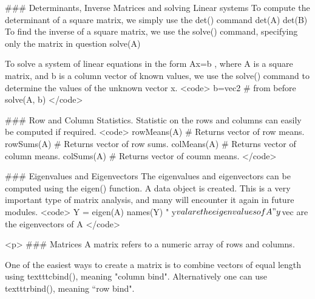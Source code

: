 ### Determinants, Inverse Matrices and solving Linear systems
To compute the determinant of a square matrix, we simply use the det() command
det(A)
det(B)
To find the inverse of a square matrix, we use the solve() command, specifying only the matrix in question
solve(A)

To solve a system of linear equations in the form Ax=b , where A is a square matrix, and b is a column vector of known values, we use the solve() command to determine the values of the unknown vector x.
<code>
b=vec2  # from before
solve(A, b)
</code>

### Row and Column Statistics.
Statistic on the rows and columns can easily be computed if required.
<code>
rowMeans(A)  # Returns vector of row means.
rowSums(A)  # Returns vector of row sums.
colMeans(A)  # Returns vector of column means.
colSums(A)  # Returns vector of coumn means.
</code>

### Eigenvalues and Eigenvectors
The eigenvalues and eigenvectors can be computed using the eigen() function.  A data object is created.
This is a very important type of matrix analysis, and many will encounter it again in future modules.
<code>
Y = eigen(A)
names(Y)
"	y$val are the eigenvalues of A
"	y$vec are the eigenvectors of A
</code>


<p>
### {Matrices}
A matrix refers to a numeric array of rows and columns.

One of the easiest ways to create a matrix is to combine vectors of equal
length using texttt{cbind()}, meaning "column bind". Alternatively one can use  texttt{rbind()}, meaning ``row bind".

